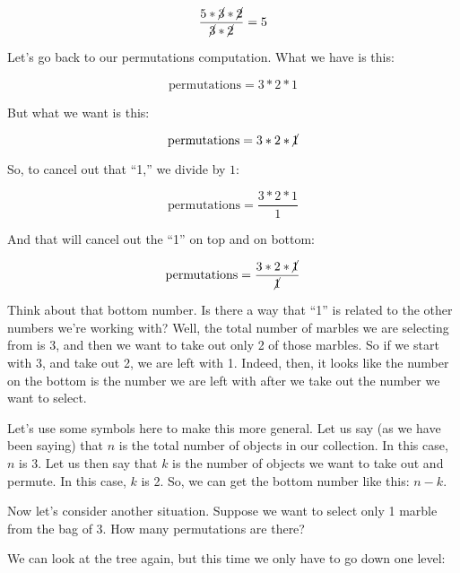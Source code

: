 \documentclass[../../../main.tex]{subfiles}
\begin{document}
\begin{equation*}
  \frac{5 * \cancel{3} * \cancel{2}}{\cancel{3} * \cancel{2}} = 5
\end{equation*}

\noindent
Let's go back to our permutations computation. What we have is this:

\begin{equation*}
  \text{permutations} = 3 * 2 * 1
\end{equation*}

\noindent
But what we want is this:

\begin{equation*}
  \text{permutations} = 3 * 2 * \cancel{1}
\end{equation*}

\noindent
So, to cancel out that ``1,'' we divide by $1$:

\begin{equation*}
  \text{permutations} = \frac{3 * 2 * 1}{1}
\end{equation*}

\noindent
And that will cancel out the ``1'' on top and on bottom:

\begin{equation*}
  \text{permutations} = \frac{3 * 2 * \cancel{1}}{\cancel{1}}
\end{equation*}

\noindent
Think about that bottom number. Is there a way that ``1'' is related to the other numbers we're working with? Well, the total number of marbles we are selecting from is 3, and then we want to take out only 2 of those marbles. So if we start with 3, and take out 2, we are left with 1. Indeed, then, it looks like the number on the bottom is the number we are left with after we take out the number we want to select.

Let's use some symbols here to make this more general. Let us say (as we have been saying) that $n$ is the total number of objects in our collection. In this case, $n$ is 3. Let us then say that $k$ is the number of objects we want to take out and permute. In this case, $k$ is 2. So, we can get the bottom number like this: $n - k$.

Now let's consider another situation. Suppose we want to select only 1 marble from the bag of 3. How many permutations are there?

We can look at the tree again, but this time we only have to go down one level:
\end{document}
